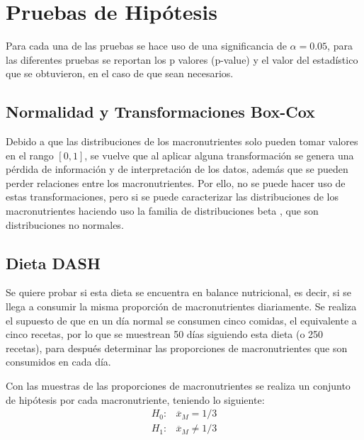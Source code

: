 \documentclass[12pt,a4paper]{article}
\begin{document}
    \section{Pruebas de Hipótesis}
    {
        Para cada una de las pruebas se hace uso de una significancia de $\alpha = 0.05$, 
        para las diferentes pruebas se reportan los p valores (p-value) y el valor del 
        estadístico que se obtuvieron, en el caso de que sean necesarios.

        \subsection{Normalidad y Transformaciones Box-Cox}
        {
            Debido a que las distribuciones de los macronutrientes solo pueden tomar valores 
            en el rango $[0,1]$, se vuelve que al aplicar alguna transformación se genera una 
            pérdida de información y de interpretación de los datos, además	que se pueden 
            perder relaciones entre los macronutrientes. Por ello, no se puede 
            hacer uso de estas transformaciones, pero si se puede caracterizar las distribuciones 
            de los macronutrientes haciendo uso la familia de distribuciones beta \cite{beta_distribution}, 
            que son distribuciones no normales.
        }
    
        \subsection{Dieta DASH}
        {
            Se quiere probar si esta dieta se encuentra 
            en balance nutricional, es decir, si se llega a consumir la 
            misma proporción de macronutrientes diariamente. 
            Se realiza el supuesto de que en un día normal se consumen 
            cinco comidas, el equivalente a cinco recetas, por lo que 
            se muestrean 50 días siguiendo esta dieta (o 250 recetas), 
            para después determinar las proporciones 
            de macronutrientes que son consumidos en cada día.\newline

            Con las muestras de las proporciones de macronutrientes se realiza 
            un conjunto de hipótesis por cada macronutriente, teniendo lo 
            siguiente:
            \begin{align*}
                H_0 :& \overline{x}_M = 1/3  \\
                H_1 :& \overline{x}_M \ne 1/3 
            \end{align*}
        
}}
\end{document}

